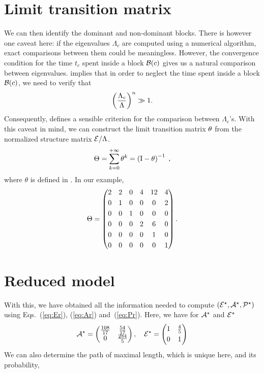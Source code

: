 \documentclass{article}
\begin{document}
\section{Limit transition matrix}
%
%
We can then identify the dominant and non-dominant blocks. There is however one caveat
here: if the eigenvalues $\Lambda _c$ are computed using a numerical algorithm, exact comparisons between them
could be meaningless. 
However, the convergence condition for the time $t_c$ spent inside a block $\mathcal B(c)$ gives us a natural comparison between
eigenvalues.
 implies that in order to neglect the time spent inside a block $\mathcal B(c)$, we need to verify that
\begin{equation} \label{eq:neglect}
\left( \frac{\Lambda _c}{\Lambda }\right)^{n} \gg 1.
\end{equation}
Consequently,  defines a sensible criterion for the comparison between $\Lambda _c$'s.  
With this caveat in mind, we can construct the limit transition matrix $\theta$ from the normalized
structure matrix $\mathcal{E}/\Lambda $.
\begin{equation}
 \Theta = \sum _{k=0}^{+\infty } \theta^{k} = \left(\mathrm I - \theta \right)^{-1} \;,
\end{equation}
where $\theta$ is defined in .
In our example,
\begin{equation}
\Theta = \begin{pmatrix}
2& 2& 0& 4& 12& 4\\[0.1cm]
0& 1& 0& 0& 0& 2\\[0.1cm]
0& 0& 1& 0& 0& 0\\[0.1cm]
0& 0& 0& 2& 6& 0\\[0.1cm]
0& 0& 0& 0& 1& 0\\[0.1cm]
0& 0& 0& 0& 0& 1
\end{pmatrix}.
\end{equation}

\section{Reduced model}
With this, we have obtained all the information needed 
to compute $\left(\mathcal{E}^{\star},\mathcal{A}^{\star},\mathcal{P}^{\star}\right)$ using Eqs.~(\ref{eq:Er}), (\ref{eq:Ar}) and~(\ref{eq:Pr}).
Here, we have for $\mathcal{A}^{\star}$ and $\mathcal{E}^{\star}$
%
\begin{equation}
\mathcal{A}^{\star}= \begin{pmatrix}
\frac{108}{17}& \frac{54}{17}\\
0& \frac{284}{5}
\end{pmatrix} ,\quad  \mathcal{E}^{\star} = \begin{pmatrix}
1& \frac{4}{5}\\[0.1cm]
0& 1
\end{pmatrix}
\end{equation}
We can also determine the path of maximal length, which is unique here, and its probability,
\end{document}
